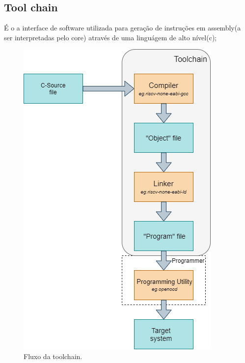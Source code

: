 \subsection{Tool chain}
É o a interface de software utilizada para geração de instruções em assembly(a ser interpretadas pelo core) através de uma linguágem de alto nível(c);
\begin{figure}[H]
  \includegraphics[width=\linewidth]{diagrams/toolchain.png}
  \caption{Fluxo da toolchain.}
  \label{fig:top}
\end{figure}
